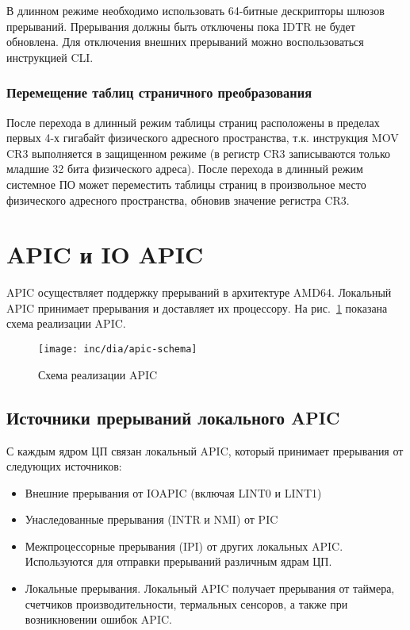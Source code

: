 В длинном режиме необходимо использовать 64-битные дескрипторы шлюзов прерываний. Прерывания должны быть
отключены пока IDTR не будет обновлена. Для отключения внешних прерываний можно воспользоваться инструкцией CLI.

\subsubsection*{Перемещение таблиц страничного преобразования}
После перехода в длинный режим таблицы страниц расположены в пределах первых 4-х гигабайт физического
адресного пространства, т.к. инструкция MOV CR3 выполняется в защищенном режиме (в регистр CR3 записываются
только младшие 32 бита физического адреса). После перехода в длинный режим
системное ПО может переместить таблицы страниц в произвольное место физического адресного пространства,
обновив значение регистра CR3.

\section{APIC и IO APIC}
APIC осуществляет поддержку прерываний в архитектуре AMD64. Локальный APIC принимает прерывания и
доставляет их процессору. На рис.~\ref{fig:apic-schema} показана схема реализации APIC.

\begin{figure}[ht!]
  \centering
  \texttt{[image: inc/dia/apic-schema]}
  \caption{Схема реализации APIC}
  \label{fig:apic-schema}
\end{figure}

\subsection{Источники прерываний локального APIC}
С каждым ядром ЦП связан локальный APIC, который принимает прерывания от следующих источников:
\begin{itemize}
	\item Внешние прерывания от IOAPIC (включая LINT0 и LINT1)
	\item Унаследованные прерывания (INTR и NMI) от PIC
	\item Межпроцессорные прерывания (IPI) от других локальных APIC. Используются
		для отправки прерываний различным ядрам ЦП.
	\item Локальные прерывания. Локальный APIC получает прерывания от таймера,
		счетчиков производительности, термальных сенсоров, а также при возникновении
		ошибок APIC.
\end{itemize}

